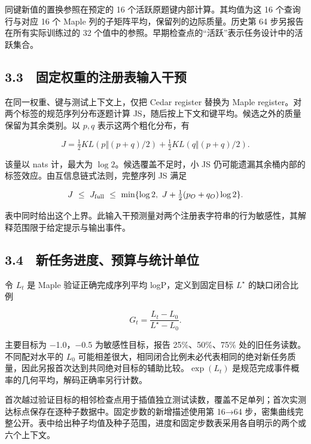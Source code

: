 \documentclass[UTF8,fontset=fandol,10pt,a4paper]{ctexart}
\begin{document}
同键新值的置换参照在预定的 16 个活跃原题键内部计算。其均值为这 16 个查询行与对应 16 个 Maple 列的子矩阵平均，保留列的边际质量。历史第 64 步另报告在所有实际训练过的 32 个值中的参照。早期检查点的“活跃”表示任务设计中的活跃集合。



\subsection*{3.3　固定权重的注册表输入干预}
在同一权重、键与测试上下文上，仅把 Cedar register 替换为 Maple register。对两个标签的规范序列分布逐题计算 JS，随后按上下文和键平均。候选之外的质量保留为其余类别。以 $p,q$ 表示这两个粗化分布，有



\[
J=\tfrac12 KL(p\Vert (p+q)/2)+\tfrac12 KL(q\Vert (p+q)/2).
\]



该量以 nats 计，最大为 $\log 2$。候选覆盖不足时，小 JS 仍可能遗漏其余桶内部的标签效应。由互信息链式法则，完整序列 JS 满足



\[
J\ \leq\ J_{\rm full}\ \leq\
\min\{\log 2,\ J+\tfrac12(p_O+q_O)\log 2\}.
\]



表中同时给出这个上界。此输入干预测量对两个注册表字符串的行为敏感性，其解释范围限于给定提示与输出事件。



\subsection*{3.4　新任务进度、预算与统计单位}
令 $L_t$ 是 Maple 验证正确完成序列平均 logP，定义到固定目标 $L^\star$ 的缺口闭合比例



\[
G_t=\frac{L_t-L_0}{L^\star-L_0}.
\]



主要目标为 −1.0，−0.5 为敏感性目标，报告 25\%、50\%、75\% 处的旧任务读数。不同配对水平的 $L_0$ 可能相差很大，相同闭合比例未必代表相同的绝对新任务质量，因此另报首次达到共同绝对目标的辅助比较。$\exp(L_t)$ 是规范完成事件概率的几何平均，解码正确率另行计数。



首次越过验证目标的相邻检查点用于插值独立测试读数，覆盖不足单列；首次实测达标点保存在逐种子数据中。固定步数的新增描述使用第 16→64 步，密集曲线完整公开。表中给出种子均值及种子范围，进度和固定步数表采用各自明示的两个或六个上下文。
\end{document}
